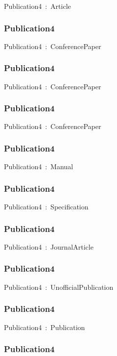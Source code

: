 \documentclass{article}
\begin{document}
Publication4~:~Article

\subsubsection*{Publication4}

Publication4~:~ConferencePaper

\subsubsection*{Publication4}

Publication4~:~ConferencePaper

\subsubsection*{Publication4}

Publication4~:~ConferencePaper

\subsubsection*{Publication4}

Publication4~:~Manual

\subsubsection*{Publication4}

Publication4~:~Specification

\subsubsection*{Publication4}

Publication4~:~JournalArticle

\subsubsection*{Publication4}

Publication4~:~UnofficialPublication

\subsubsection*{Publication4}

Publication4~:~Publication

\subsubsection*{Publication4}
\end{document}
